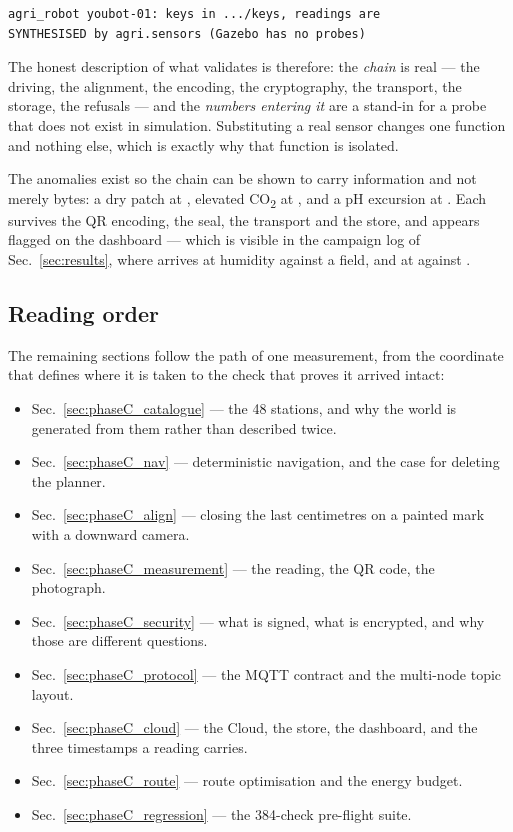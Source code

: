 \begin{lstlisting}[style=bash]
agri_robot youbot-01: keys in .../keys, readings are
SYNTHESISED by agri.sensors (Gazebo has no probes)
\end{lstlisting}

The honest description of what \phaseC{} validates is therefore: the
\emph{chain} is real --- the driving, the alignment, the encoding, the
cryptography, the transport, the storage, the refusals --- and the
\emph{numbers entering it} are a stand-in for a probe that does not
exist in simulation. Substituting a real sensor changes one function and
nothing else, which is exactly why that function is isolated.

The anomalies exist so the chain can be shown to carry information and
not merely bytes: a dry patch at , elevated
CO\textsubscript{2} at , and a pH excursion at
. Each survives the QR encoding, the seal, the transport
and the store, and appears flagged on the dashboard --- which is
visible in the campaign log of Sec.~\ref{sec:results}, where
 arrives at  humidity against a
 field, and  at
 against .

\subsection{Reading order}

The remaining \phaseC{} sections follow the path of one measurement,
from the coordinate that defines where it is taken to the check that
proves it arrived intact:

\begin{itemize}[leftmargin=*,itemsep=1pt,topsep=2pt]
  \item Sec.~\ref{sec:phaseC_catalogue} --- the 48 stations, and why the
        world is generated from them rather than described twice.
  \item Sec.~\ref{sec:phaseC_nav} --- deterministic navigation, and the
        case for deleting the planner.
  \item Sec.~\ref{sec:phaseC_align} --- closing the last centimetres on
        a painted mark with a downward camera.
  \item Sec.~\ref{sec:phaseC_measurement} --- the reading, the QR code,
        the photograph.
  \item Sec.~\ref{sec:phaseC_security} --- what is signed, what is
        encrypted, and why those are different questions.
  \item Sec.~\ref{sec:phaseC_protocol} --- the MQTT contract and the
        multi-node topic layout.
  \item Sec.~\ref{sec:phaseC_cloud} --- the Cloud, the store, the
        dashboard, and the three timestamps a reading carries.
  \item Sec.~\ref{sec:phaseC_route} --- route optimisation and the
        energy budget.
  \item Sec.~\ref{sec:phaseC_regression} --- the 384-check pre-flight
        suite.
\end{itemize}
